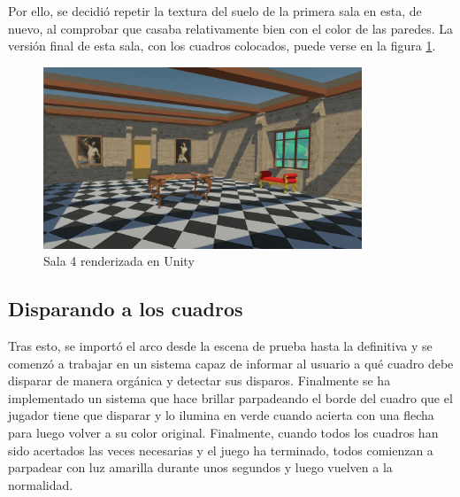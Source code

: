 Por ello, se decidió repetir la textura del suelo de la primera sala en esta, de nuevo, al comprobar que casaba relativamente bien con el color de las paredes. La versión final de esta sala, con los cuadros colocados, puede verse en la figura \ref{fig:unity-sala-4}.

\begin{figure}[!h]
\begin{center}
\includegraphics[width=0.85\textwidth]{imagenes/7/salas-unity/unity-sala-4.png}
\caption{Sala 4 renderizada en Unity}
\label{fig:unity-sala-4}
\end{center}
\end{figure}

\subsection{Disparando a los cuadros}

Tras esto, se importó el arco desde la escena de prueba hasta la definitiva y se comenzó a trabajar en un sistema capaz de informar al usuario a qué cuadro debe disparar de manera orgánica y detectar sus disparos. Finalmente se ha implementado un sistema que hace brillar parpadeando el borde del cuadro que el jugador tiene que disparar y lo ilumina en verde cuando acierta con una flecha para luego volver a su color original. Finalmente, cuando todos los cuadros han sido acertados las veces necesarias y el juego ha terminado, todos comienzan a parpadear con luz amarilla durante unos segundos y luego vuelven a la normalidad.

